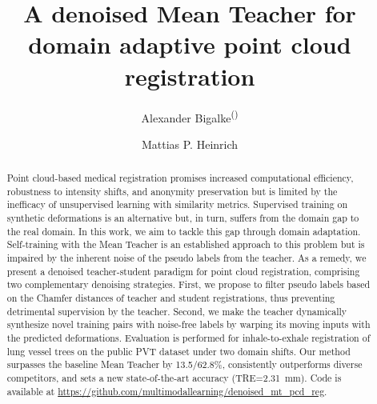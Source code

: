 \documentclass[runningheads]{llncs}
\begin{document}
%
\title{A denoised Mean Teacher for domain adaptive point cloud registration}
%
%
\author{Alexander Bigalke\textsuperscript{(\Letter)} \and
Mattias P. Heinrich}

%
%
%
\maketitle              %
%
\begin{abstract}
Point cloud-based medical registration promises increased computational efficiency, robustness to intensity shifts, and anonymity preservation but is limited by the inefficacy of unsupervised learning with similarity metrics.
Supervised training on synthetic deformations is an alternative but, in turn, suffers from the domain gap to the real domain.
In this work, we aim to tackle this gap through domain adaptation.
Self-training with the Mean Teacher is an established approach to this problem but is impaired by the inherent noise of the pseudo labels from the teacher.
As a remedy, we present a denoised teacher-student paradigm for point cloud registration, comprising two complementary denoising strategies.
First, we propose to filter pseudo labels based on the Chamfer distances of teacher and student registrations, thus preventing detrimental supervision by the teacher.
Second, we make the teacher dynamically synthesize novel training pairs with noise-free labels by warping its moving inputs with the predicted deformations.
Evaluation is performed for inhale-to-exhale registration of lung vessel trees on the public PVT dataset under two domain shifts.
Our method surpasses the baseline Mean Teacher by 13.5/62.8\%, consistently outperforms diverse competitors, and sets a new state-of-the-art accuracy (TRE=\SI{2.31}{mm}).
Code is available at \url{https://github.com/multimodallearning/denoised_mt_pcd_reg}.

\end{abstract}
%
%
%
\end{document}
